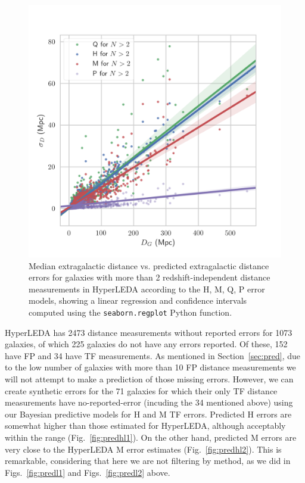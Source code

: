 \documentclass[a4paper,fleqn,usenatbib]{mnras}
\begin{document}
\begin{figure}
	\includegraphics[scale=0.7]{HLhigh.png}
    \caption{Median extragalactic distance vs. predicted extragalactic distance errors for galaxies with more than 2 redshift-independent distance measurements in HyperLEDA according to the H, M, Q, P error models, showing a linear regression and confidence intervals computed using the \texttt{seaborn.regplot} Python function.}
    \label{fig:HLhigh}
\end{figure}
HyperLEDA has 2473 distance measurements without reported errors for 1073 galaxies, of which 225 galaxies do not have any errors reported. Of these, 152 have FP and 34 have TF measurements. As mentioned in Section~\ref{sec:pred}, due to the low number of galaxies with more than 10 FP distance measurements we will not attempt to make a prediction of those missing errors. However, we can create synthetic errors for the 71 galaxies for which their only TF distance measurements have no-reported-error (incuding the 34 mentioned above) using our Bayesian predictive models for H and M TF errors. Predicted H errors are somewhat higher than those estimated for HyperLEDA, although acceptably within the range (Fig.~\ref{fig:predhl1}). On the other hand, predicted M errors are very close to the HyperLEDA M error estimates (Fig.~\ref{fig:predhl2}). This is remarkable, considering that here we are not filtering by method, as we did in Figs.~\ref{fig:predl1} and Figs.~\ref{fig:predl2} above.
\end{document}
